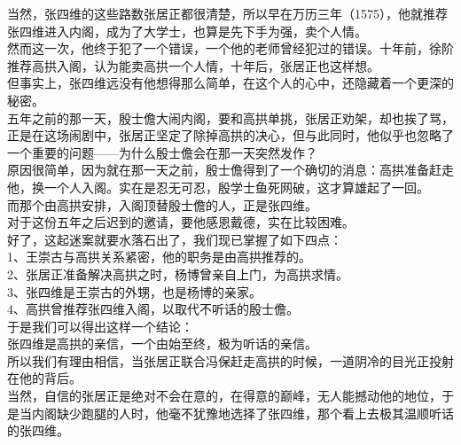 \begin{multicols}{\theparacolNo}
当然，张四维的这些路数张居正都很清楚，所以早在万历三年（1575），他就推荐张四维进入内阁，成为了大学士，也算是先下手为强，卖个人情。\\

然而这一次，他终于犯了一个错误，一个他的老师曾经犯过的错误。十年前，徐阶推荐高拱入阁，认为能卖高拱一个人情，十年后，张居正也这样想。\\

但事实上，张四维远没有他想得那么简单，在这个人的心中，还隐藏着一个更深的秘密。\\

五年之前的那一天，殷士儋大闹内阁，要和高拱单挑，张居正劝架，却也挨了骂，正是在这场闹剧中，张居正坚定了除掉高拱的决心，但与此同时，他似乎也忽略了一个重要的问题——为什么殷士儋会在那一天突然发作？\\

原因很简单，因为就在那一天之前，殷士儋得到了一个确切的消息：高拱准备赶走他，换一个人入阁。实在是忍无可忍，殷学士鱼死网破，这才算雄起了一回。\\

而那个由高拱安排，入阁顶替殷士儋的人，正是张四维。\\

对于这份五年之后迟到的邀请，要他感恩戴德，实在比较困难。\\

好了，这起迷案就要水落石出了，我们现已掌握了如下四点：\\

1、王崇古与高拱关系紧密，他的职务是由高拱推荐的。\\

2、张居正准备解决高拱之时，杨博曾亲自上门，为高拱求情。\\

3、张四维是王崇古的外甥，也是杨博的亲家。\\

4、高拱曾推荐张四维入阁，以取代不听话的殷士儋。\\

于是我们可以得出这样一个结论：\\

张四维是高拱的亲信，一个由始至终，极为听话的亲信。\\

所以我们有理由相信，当张居正联合冯保赶走高拱的时候，一道阴冷的目光正投射在他的背后。\\

当然，自信的张居正是绝对不会在意的，在得意的巅峰，无人能撼动他的地位，于是当内阁缺少跑腿的人时，他毫不犹豫地选择了张四维，那个看上去极其温顺听话的张四维。\\


\end{multicols}
